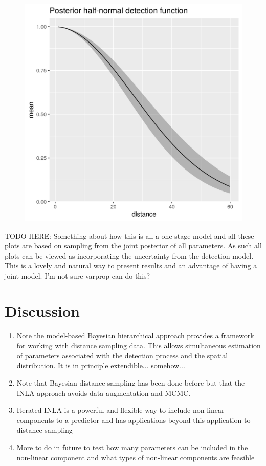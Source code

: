 \documentclass[preprint,12pt]{elsarticle}
\begin{document}
\begin{figure}
	\includegraphics[scale=0.6]{figures/halfnormal.png}
\end{figure}

\bigskip 

TODO HERE:  Something about how this is all a one-stage model and all these plots are based on sampling from the joint posterior of all parameters.  As such all plots can be viewed as incorporating the uncertainty from the detection model.  This is a lovely and natural way to present results and an advantage of having a joint model.  I'm not sure varprop can do this?  

\newpage

\section*{Discussion}

\begin{enumerate}
	\item Note the model-based Bayesian hierarchical approach provides a framework for working with distance sampling data.  This allows simultaneous estimation of parameters associated with the detection process and the spatial distribution.  It is in principle extendible... somehow...  
	\item Note that Bayesian distance sampling has been done before but that the INLA approach avoids data augmentation and MCMC.  
	\item Iterated INLA is a powerful and flexible way to include non-linear components to a predictor and has applications beyond this application to distance sampling
	\item More to do in future to test how many parameters can be included in the non-linear component and what types of non-linear components are feasible

\end{enumerate}



\end{document}
